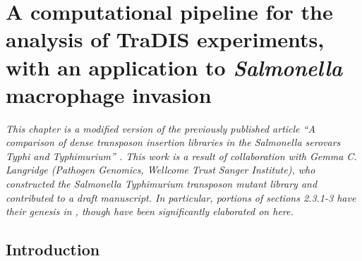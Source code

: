 
\chapter{A computational pipeline for the analysis of TraDIS experiments, with an application to {\it Salmonella} macrophage invasion}
\label{sec:chapterPingpong}
\ifpdf
    \graphicspath{{Chapter3/Chapter3Figs/EPS/}{Chapter3/Chapter3Figs/}}
\fi

\textit{This chapter is a modified version of the previously published article ``A comparison of dense transposon insertion libraries in the \emph{Salmonella} serovars Typhi and Typhimurium'' \parencite{Barquist2013a}. This work is a result of collaboration with Gemma C. Langridge (Pathogen Genomics, Wellcome Trust Sanger Institute), who constructed the \emph{Salmonella} Typhimurium transposon mutant library and contributed to a draft manuscript. In particular, portions of sections 2.3.1-3 have their genesis in \textcite{Langridge2010}, though have been significantly elaborated on here.}

\section{Introduction}


